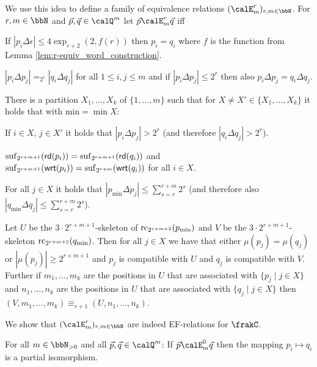 We use this idea to  define a family of  equivalence relations $(\calE^r_m)_{r,m\in\bbN}$.
For $r,m\in \bbN$ and $\vec{p},\vec{q}\in \Qx^m$ let $\vec{p} \calE^r_m \vec{q}$ iff
\begin{bracketenumerate}
	\item If $|p_i \Delta \epsilon| \leq 4\exp_{r+2}(2, f(r))$ then $p_i=q_i$ where $f$ is the function from Lemma \ref{lem:r-equiv_word_construction}.
	\item\label{item:E_distance} $|p_i \Delta p_j| =_{2^r} |q_i\Delta q_j|$ for all $1\leq i, j\leq m$ and if $|p_i\Delta p_j| \leq 2^r$ then also $p_i \Delta p_j = q_i\Delta q_j$. 
	\item\label{item:E_partition} There is a partition $X_1,\ldots,X_k$ of $\{1,\ldots,m\}$ such that for $X\neq X'\in \{X_1,\ldots,X_k\}$ it holds that with $\text{min} = \min X$: 
	\begin{alphaenumerate}
		\item\label{item:part_distance} If $i\in X$, $j\in X'$ it holds that $|p_i\Delta p_j| > 2^r$ (and therefore $|q_i\Delta q_j| > 2^r$).
		\item\label{item:E_suffix} $\operatorname{suf}_{2^{r+m+1}}(\mathsf{rd}(p_i)) = \operatorname{suf}_{2^{r+m+1}}(\mathsf{rd}(q_i))$ and \\$\operatorname{suf}_{2^{r+m+1}}(\mathsf{wrt}(p_i)) = \operatorname{suf}_{2^{r+m}}(\mathsf{wrt}(q_i))$ for all $i\in X$.
		\item For all $j\in X$ it holds that $|p_\text{min} \Delta p_j| \leq \sum_{s= r}^{r+m} 2^s$ (and therefore also $|q_\text{min} \Delta q_j| \leq \sum_{s= r}^{r+m} 2^s$).
		\item\label{subitem:E_partition:equivalence} Let $U$ be the $3\cdot 2^{r+m+1}$-skeleton of $\operatorname{rc}_{2^{r+m+2}}(p_\text{min})$ and $V$ be the $3\cdot 2^{r+m+1}$-skeleton $\operatorname{rc}_{2^{r+m+2}}(q_\text{min})$. Then for all 
		$j\in X$ we have that either $\mu(p_j) = \mu(q_j)$ or $|\mu(p_j)| \geq 2^{r+m+1}$ and $p_j$ is compatible with $U$ and $q_j$ is compatible with $V$. Further if $m_1,\ldots, m_k$ are the positions in $U$ that are associated with $\{p_j \mid j\in X \}$ and $n_1,\ldots, n_k$ are the positions in $U$ that are associated with $\{q_j \mid j\in X \}$ then $(V,m_1,\ldots,m_k) \equiv_{r+1} (U,n_1,\ldots,n_k)$.
	\end{alphaenumerate}  
\end{bracketenumerate} 
We show that $(\calE^r_m)_{r,m\in\bbN}$ are indeed EF-relations for $\frakC$.
\begin{lemma}\label{lem:partial_isomorphism}
	For all $m\in\bbN_{>0}$ and all $\vec{p},\vec{q} \in \Qx^m$: If $\vec{p} \calE^0_m \vec{q}$ then the mapping $p_i \mapsto q_i$ is a partial isomorphism.
\end{lemma}
